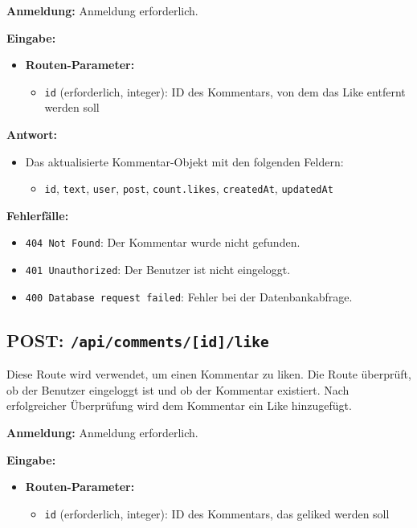 \documentclass[a4paper,12pt]{article}
\begin{document}
\textbf{Anmeldung:} Anmeldung erforderlich.

\textbf{Eingabe:}
\begin{itemize}
    \item \textbf{Routen-Parameter:}
    \begin{itemize}
        \item \texttt{id} (erforderlich, integer):
            ID des Kommentars, von dem das Like entfernt werden soll
    \end{itemize}
\end{itemize}

\textbf{Antwort:}
\begin{itemize}
    \item Das aktualisierte Kommentar-Objekt mit den folgenden Feldern:
    \begin{itemize}
        \item \texttt{id},
              \texttt{text},
              \texttt{user},
              \texttt{post},
              \texttt{count.likes},
              \texttt{createdAt},
              \texttt{updatedAt}
    \end{itemize}
\end{itemize}

\textbf{Fehlerfälle:}
\begin{itemize}
    \item \texttt{404 Not Found}:
        Der Kommentar wurde nicht gefunden.
    \item \texttt{401 Unauthorized}:
        Der Benutzer ist nicht eingeloggt.
    \item \texttt{400 Database request failed}:
        Fehler bei der Datenbankabfrage.
\end{itemize}

\newpage
\subsection{POST: \texttt{/api/comments/[id]/like}}

Diese Route wird verwendet, um einen Kommentar zu liken. Die Route überprüft,
ob der Benutzer eingeloggt ist und ob der Kommentar existiert. Nach
erfolgreicher Überprüfung wird dem Kommentar ein Like hinzugefügt.

\textbf{Anmeldung:} Anmeldung erforderlich.

\textbf{Eingabe:}
\begin{itemize}
    \item \textbf{Routen-Parameter:}
    \begin{itemize}
        \item \texttt{id} (erforderlich, integer):
            ID des Kommentars, das geliked werden soll
    \end{itemize}
\end{itemize}
\end{document}
